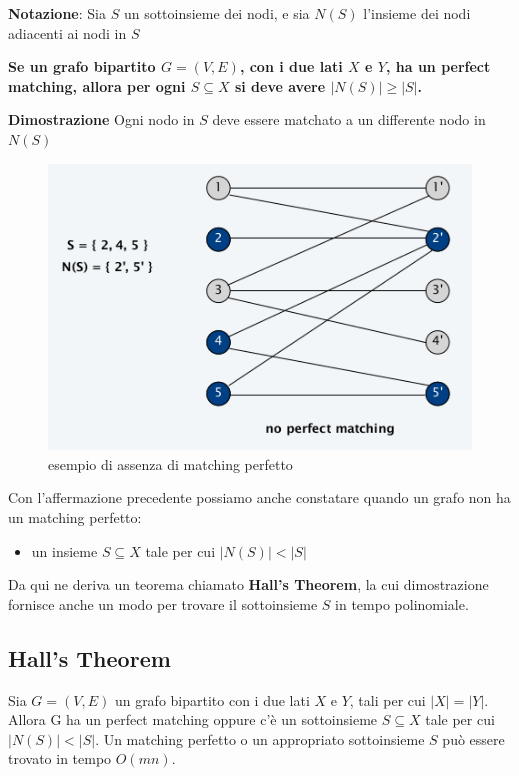 \textbf{Notazione}: Sia $S$ un sottoinsieme dei nodi, e sia $N(S)$
l'insieme dei nodi adiacenti ai nodi in $S$

\begin{myblockquote}
	\textbf{Se un grafo bipartito $G = (V, E)$, con i due lati $X$ e
		$Y$, ha un perfect matching, allora per ogni $S \subseteq X$ si deve
		avere $|N(S)| \ge |S|$.}
\end{myblockquote}

\textbf{Dimostrazione} Ogni nodo in $S$ deve essere matchato a un
differente nodo in $N(S)$\\

\begin{figure}[H]
	\centering
	\includegraphics[width = 10 cm]{capitoli/network_flow/imgs/bipartite2.png}
	\caption{esempio di assenza di matching perfetto}
\end{figure}

Con l'affermazione precedente possiamo anche constatare quando un grafo
non ha un matching perfetto:
\begin{itemize}
	\item un insieme $S \subseteq X$ tale per cui $|N(S)| < |S|$
\end{itemize}

Da qui ne deriva un teorema chiamato \textbf{Hall's Theorem}, la cui
dimostrazione fornisce anche un modo per trovare il sottoinsieme $S$
in tempo polinomiale.

\subsection{Hall's Theorem}

Sia $G=(V, E)$ un grafo bipartito con i due lati $X$ e $Y$, tali
per cui $|X| = |Y|$. Allora G ha un perfect matching oppure c'è un
sottoinsieme $S \subseteq X$ tale per cui $|N(S)| < |S|$. Un
matching perfetto o un appropriato sottoinsieme $S$ può essere trovato
in tempo $O(mn)$.\\

